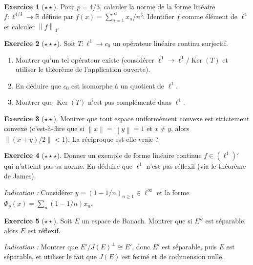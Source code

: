 \documentclass[a4paper,12pt]{book}
\DeclareMathOperator{\Ker}{Ker}
\newcommand{\R}{\mathbb{R}}
\newcommand{\norm}[1]{\left\| #1 \right\|}
\theoremstyle{definition}
\newtheorem{exercice}{Exercice}[chapter]
\theoremstyle{plain}
\theoremstyle{remark}
\begin{document}
\begin{exercice}[$\star\star$]
\label{exo:lp-dual-calcul}
Pour $p = 4/3$, calculer la norme de la forme linéaire
$f : \ell^{4/3} \to \R$ définie par
$f(x) = \sum_{n=1}^{\infty} x_n / n^3$.
Identifier $f$ comme élément de $\ell^4$ et calculer $\norm{f}_4$.
\end{exercice}

\begin{exercice}[$\star\star\star$]
\label{exo:l1-quotient-c0}
Soit $T : \ell^1 \to c_0$ un opérateur linéaire continu surjectif.
\begin{enumerate}[label=(\alph*)]
  \item Montrer qu'un tel opérateur existe (considérer $\ell^1 \to \ell^1/\Ker(T)$
    et utiliser le théorème de l'application ouverte).
  \item En déduire que $c_0$ est isomorphe à un quotient de $\ell^1$.
  \item Montrer que $\Ker(T)$ n'est pas complémenté dans $\ell^1$.
\end{enumerate}
\end{exercice}

\begin{exercice}[$\star\star$]
\label{exo:unif-convexe-strict}
Montrer que tout espace uniformément convexe est strictement convexe
(c'est-à-dire que si $\norm{x} = \norm{y} = 1$ et $x \neq y$, alors
$\norm{(x+y)/2} < 1$). La réciproque est-elle vraie ?
\end{exercice}

\begin{exercice}[$\star\star\star$]
\label{exo:james-l1}
Donner un exemple de forme linéaire continue $f \in (\ell^1)'$ qui n'atteint pas
sa norme. En déduire que $\ell^1$ n'est pas réflexif (via le théorème de James).

\textit{Indication :} Considérer $y = (1 - 1/n)_{n \ge 1} \in \ell^\infty$ et la forme
$\Phi_y(x) = \sum_n (1-1/n) x_n$.
\end{exercice}

\begin{exercice}[$\star\star$]
\label{exo:reflexif-bidual-quotient}
Soit $E$ un espace de Banach. Montrer que si $E''$ est séparable, alors $E$
est réflexif.

\textit{Indication :} Montrer que $E'/J(E)^\perp \cong E'$, donc $E'$ est séparable,
puis $E$ est séparable, et utiliser le fait que $J(E)$ est fermé et de codimension
nulle.
\end{exercice}
\end{document}
